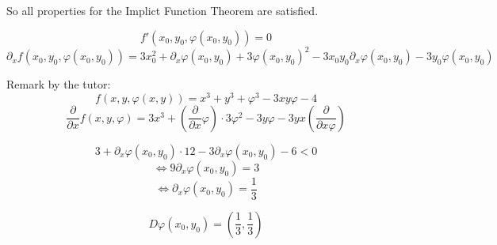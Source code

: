 \documentclass[a4paper]{article}
\theoremstyle{definition}
\begin{document}
So all properties for the Implict Function Theorem are satisfied.

\[ f'(x_0, y_0, \varphi(x_0, y_0)) = 0 \]
\[ \partial_x f(x_0, y_0, \varphi(x_0, y_0)) = 3x_0^2 + \partial_x \varphi(x_0, y_0) + 3 \varphi(x_0, y_0)^2 - 3 x_0 y_0 \partial_x \varphi(x_0, y_0) - 3 y_0 \varphi(x_0, y_0) \]

Remark by the tutor:
\[ f(x, y, \varphi(x, y)) = x^3 + y^3 + \varphi^3 - 3xy \varphi - 4 \]
\[ \frac{\partial}{\partial x} f(x, y, \varphi) = 3x^3 + \left(\frac{\partial}{\partial x} \varphi\right) \cdot 3 \varphi^2 - 3y \varphi - 3yx \left(\frac{\partial}{\partial x \varphi}\right) \]


\[ 3 + \partial_x \varphi(x_0, y_0) \cdot 12 - 3 \partial_x \varphi(x_0, y_0) - 6 < 0 \]
\[ \iff 9 \partial_x \varphi(x_0, y_0) = 3 \]
\[ \iff \partial_x \varphi(x_0, y_0) = \frac13 \]

\[ D\varphi(x_0, y_0) = \left(\frac13, \frac13\right) \]
\end{document}
